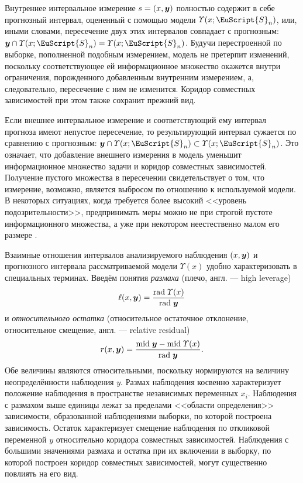 \documentclass[a5paper,openany]{book}
\newcommand{\mbf}[1]{\protect\text{\boldmath$#1$}}
\newcommand{\eus}{\EuScript}
\newcommand{\m}{\mathrm{mid}\;}
\renewcommand{\r}{\mathrm{rad}\;}
\begin{document}
Внутреннее интервальное измерение $s = (x,\mbf{y})$ полностью содержит в себе 
прогнозный интервал, оцененный с помощью модели $\varUpsilon(x;\eus{S}_{n})$, или, 
иными словами, пересечение двух этих интервалов совпадает с прогнозным: $\mbf{y} 
\cap \varUpsilon(x;\eus{S}_{n}) =  \varUpsilon(x;\eus{S}_{n})$. Будучи перестроенной 
по выборке, пополненной подобным измерением, модель не претерпит изменений, поскольку 
соответствующее ей информационное множество окажется внутри ограничения, порожденного 
добавленным внутренним измерением, а, следовательно, пересечение с ним не изменится. 
Коридор совместных зависимостей при этом также сохранит прежний вид. 
  
Если внешнее интервальное измерение и соответствующий ему интервал прогноза имеют 
непустое пересечение, то результирующий интервал сужается по сравнению с прогнозным:  
$\mbf{y} \cap \varUpsilon(x; \eus{S}_{n}) \subset \varUpsilon(x;\eus{S}_{n})$. 
Это означает, что добавление внешнего измерения в модель уменьшит информационное 
множество задачи и коридор совместных зависимостей. Получение пустого множества 
в пересечении свидетельствует о том, что измерение, возможно, является выбросом 
по отношению к используемой модели. В некоторых ситуациях, когда требуется более 
высокий <<уровень подозрительности>>, предпринимать меры можно не при строгой пустоте 
информационного множества, а уже при некотором неестественно малом его размере 
\cite{KreinovichGeodesy}. 
  
Взаимные отношения интервалов анализируемого наблюдения $(x,\mbf{y})$ и прогнозного 
интервала рассматриваемой модели $\varUpsilon(x)$ удобно характеризовать в специальных 
терминах. Введём понятия \emph{размаха} (плечо, англ. --- high leverage) 
\begin{equation} 
\label{IntLeverage}
\ell(x,\mbf{y}) = \frac{\r \varUpsilon(x)}{\r\mbf{y}} 
\end{equation}
и \emph{относительного остатка} (относительное остаточное отклонение,  относительное смещение, англ. --- relative residual) 
\begin{equation} 
\label{IntResidual}
\index{относительный остаток}
r(x,\mbf{y}) = \frac{\m\mbf{y} - \m\varUpsilon(x)}{\r\mbf{y}}. 
\end{equation}
Обе величины являются относительными, поскольку нормируются на величину неопределённости 
наблюдения $y$. Размах наблюдения косвенно характеризует положение наблюдения 
в пространстве  независимых переменных $x_i$. Наблюдения с размахом выше единицы лежат 
за пределами <<области определения>> зависимости, образованной наблюдениями выборки, 
по которой построена зависимость. Остаток характеризует смещение наблюдения по откликовой 
переменной $y$ относительно коридора совместных зависимостей. Наблюдения с большими 
значениями размаха и остатка при их включении в выборку, по которой построен коридор 
совместных зависимостей, могут существенно повлиять на его вид. 
 
\end{document}
